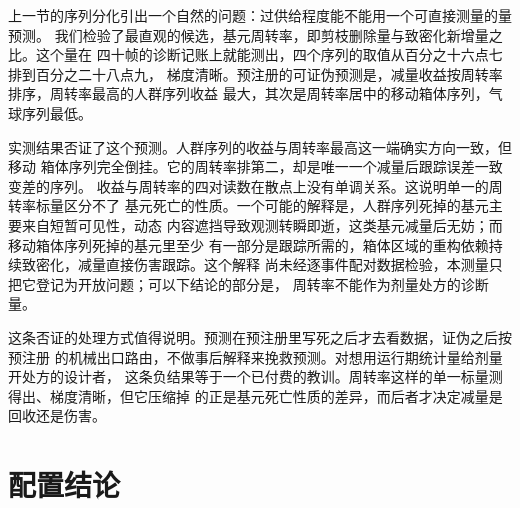 上一节的序列分化引出一个自然的问题：过供给程度能不能用一个可直接测量的量预测。
我们检验了最直观的候选，基元周转率，即剪枝删除量与致密化新增量之比。这个量在
四十帧的诊断记账上就能测出，四个序列的取值从百分之十六点七排到百分之二十八点九，
梯度清晰。预注册的可证伪预测是，减量收益按周转率排序，周转率最高的人群序列收益
最大，其次是周转率居中的移动箱体序列，气球序列最低。

实测结果否证了这个预测。人群序列的收益与周转率最高这一端确实方向一致，但移动
箱体序列完全倒挂。它的周转率排第二，却是唯一一个减量后跟踪误差一致变差的序列。
收益与周转率的四对读数在散点上没有单调关系。这说明单一的周转率标量区分不了
基元死亡的性质。一个可能的解释是，人群序列死掉的基元主要来自短暂可见性，动态
内容遮挡导致观测转瞬即逝，这类基元减量后无妨；而移动箱体序列死掉的基元里至少
有一部分是跟踪所需的，箱体区域的重构依赖持续致密化，减量直接伤害跟踪。这个解释
尚未经逐事件配对数据检验，本测量只把它登记为开放问题；可以下结论的部分是，
周转率不能作为剂量处方的诊断量。

这条否证的处理方式值得说明。预测在预注册里写死之后才去看数据，证伪之后按预注册
的机械出口路由，不做事后解释来挽救预测。对想用运行期统计量给剂量开处方的设计者，
这条负结果等于一个已付费的教训。周转率这样的单一标量测得出、梯度清晰，但它压缩掉
的正是基元死亡性质的差异，而后者才决定减量是回收还是伤害。

\section{配置结论}
\label{sec:study3-config}

